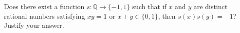 Does there exist a function $s : \mathbb{Q} \to \{-1, 1\}$ such that if $x$ and $y$ are distinct rational numbers satisfying $xy = 1$ or $x + y \in \{0, 1\}$, then $s(x)s(y) = -1$? Justify your answer.

